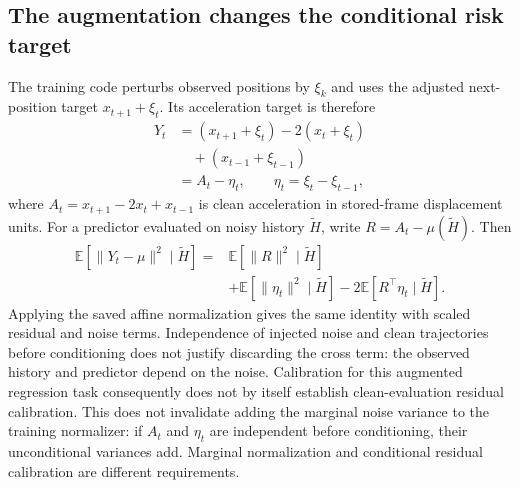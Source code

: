\subsection{The augmentation changes the conditional risk target}
\label{sec:noise-augmentation}
The training code perturbs observed positions by $\xi_k$ and uses the adjusted
next-position target $x_{t+1}+\xi_t$. Its acceleration target is therefore
\begin{align}
Y_t
&=(x_{t+1}+\xi_t)-2(x_t+\xi_t) \nonumber\\
&\quad +(x_{t-1}+\xi_{t-1}) \nonumber\\
&=A_t-\eta_t,\qquad \eta_t=\xi_t-\xi_{t-1},
\label{eq:noise-target-identity}
\end{align}
where $A_t=x_{t+1}-2x_t+x_{t-1}$ is clean acceleration in stored-frame
displacement units. For a predictor evaluated on noisy history $\widetilde H$,
write $R=A_t-\mu(\widetilde H)$. Then
\begin{align}
\mathbb E[\|Y_t-\mu\|^2\mid\widetilde H]
={}&\mathbb E[\|R\|^2\mid\widetilde H] \nonumber\\
&+\mathbb E[\|\eta_t\|^2\mid\widetilde H]
-2\mathbb E[R^\top\eta_t\mid\widetilde H].
\label{eq:noise-risk-decomposition}
\end{align}
Applying the saved affine normalization gives the same identity with scaled
residual and noise terms. Independence of injected noise and clean trajectories
before conditioning does not justify discarding the cross term: the observed
history and predictor depend on the noise. Calibration for this augmented
regression task consequently does not by itself establish clean-evaluation
residual calibration.
This does not invalidate adding the marginal noise variance to the training
normalizer: if $A_t$ and $\eta_t$ are independent before conditioning, their
unconditional variances add. Marginal normalization and conditional residual
calibration are different requirements.

